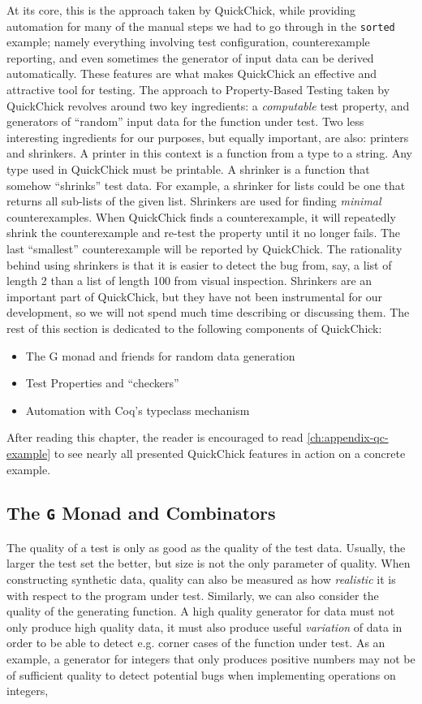 \documentclass[twoside,11pt,openright]{report}
\newcommand{\pbt}{Property-Based Testing}
\newcommand{\coq}[1]{\texttt{#1}}
\begin{document}
At its core, this is the approach taken by QuickChick, while providing automation for many of the manual steps we had to go through in the \coq{sorted} example; namely everything involving test configuration, counterexample reporting, and even sometimes the generator of input data can be derived automatically. These features are what makes QuickChick an effective and attractive tool for testing. The approach to \pbt{} taken by QuickChick revolves around two key ingredients: a \textit{computable} test property, and generators of ``random'' input data for the function under test. Two less interesting ingredients for our purposes, but equally important, are also: printers and shrinkers. A printer in this context is a function from a type to a string. Any type used in QuickChick must be printable. A shrinker is a function that somehow ``shrinks'' test data. For example, a shrinker for lists could be one that returns all sub-lists of the given list. Shrinkers are used for finding \textit{minimal} counterexamples. When QuickChick finds a counterexample, it will repeatedly shrink the counterexample and re-test the property until it no longer fails. The last ``smallest'' counterexample will be reported by QuickChick. The rationality behind using shrinkers is that it is easier to detect the bug from, say, a list of length 2 than a list of length 100 from visual inspection. Shrinkers are an important part of QuickChick, but they have not been instrumental for our development, so we will not spend much time describing or discussing them. The rest of this section is dedicated to the following components of QuickChick:
\begin{itemize}
    \item The G monad and friends for random data generation
    \item Test Properties and ``checkers''
    \item Automation with Coq's typeclass mechanism
\end{itemize}
After reading this chapter, the reader is encouraged to read \autoref{ch:appendix-qc-example} to see nearly all presented QuickChick features in action on a concrete example.
\subsection{The \coq{G} Monad and Combinators}
The quality of a test is only as good as the quality of the test data. Usually, the larger the test set the better, but size is not the only parameter of quality. When constructing synthetic data, quality can also be measured as how \textit{realistic} it is with respect to the program under test. Similarly, we can also consider the quality of the generating function. A high quality generator for data must not only produce high quality data, it must also produce useful \textit{variation} of data in order to be able to detect e.g. corner cases of the function under test. As an example, a generator for integers that only produces positive numbers may not be of sufficient quality to detect potential bugs when implementing operations on integers,
\end{document}

